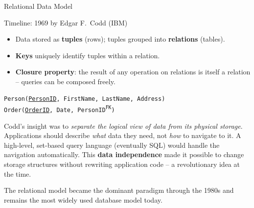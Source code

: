 \begin{frame}{Relational Data Model}
  \begin{block}{Timeline: 1969 by Edgar F.\ Codd (IBM)}
    \begin{itemize}
      \item Data stored as \textbf{tuples} (rows); tuples grouped into
            \textbf{relations} (tables).
      \item \textbf{Keys} uniquely identify tuples within a relation.
      \item \textbf{Closure property}: the result of any operation on relations
            is itself a relation -- queries can be composed freely.
    \end{itemize}
  \end{block}

  \begin{examples}{}
    \texttt{Person(\underline{PersonID}, FirstName, LastName, Address)}\\
    \texttt{Order(\underline{OrderID}, Date, PersonID\textsuperscript{FK})}
  \end{examples}

  Codd's insight was to \emph{separate the logical view of data from its
  physical storage}.  Applications should describe \emph{what} data they need,
  not \emph{how} to navigate to it.  A high-level, set-based query language
  (eventually SQL) would handle the navigation automatically.
  This \textbf{data independence} made it possible to change storage structures
  without rewriting application code -- a revolutionary idea at the time.

  The relational model became the dominant paradigm through the 1980s and
  remains the most widely used database model today.
\end{frame}

